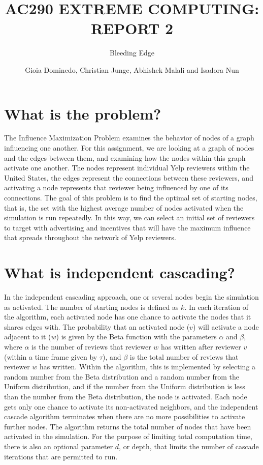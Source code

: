 \documentclass[11pt]{scrartcl} %
\title{AC290 EXTREME COMPUTING: REPORT 2}
\subtitle{Bleeding Edge}
\author{Gioia Dominedo, Christian Junge, Abhishek Malali and Isadora Nun}
\begin{document}
\maketitle

\section{What is the problem?}

\setlength{\parindent}{10ex}

The Influence Maximization Problem examines the behavior of nodes of a graph influencing one another.  For this assignment, we are looking at a graph of nodes and the edges between them, and examining how the nodes within this graph activate one another.  The nodes represent individual Yelp reviewers within the United States, the edges represent the connections between these reviewers, and activating a node represents that reviewer being influenced by one of its connections.  The goal of this problem is to find the optimal set of starting nodes, that is, the set with the highest average number of nodes activated when the simulation is run repeatedly.  In this way, we can select an initial set of reviewers to target with advertising and incentives that will have the maximum influence that spreads throughout the network of Yelp reviewers.  


\section{What is independent cascading?}

In the independent cascading approach, one or several nodes begin the simulation as activated.  The number of starting nodes is defined as $k$. In each iteration of the algorithm, each activated node has one chance to activate the nodes that it shares edges with.  The probability that an activated node ($v$) will activate a node adjacent to it ($w$) is given by the Beta function with the parameters $\alpha$ and $\beta$, where $\alpha$ is the number of reviews that reviewer $w$ has written after reviewer $v$ (within a time frame given by $\tau$), and $\beta$ is the total number of reviews that reviewer $w$ has written.  Within the algorithm, this is implemented by selecting a random number from the Beta distribution and a random number from the Uniform distribution, and if the number from the Uniform distribution is less than the number from the Beta distribution, the node is activated.  Each node gets only one chance to activate its non-activated neighbors, and the independent cascade algorithm terminates when there are no more possibilities to activate further nodes.  The algorithm returns the total number of nodes that have been activated in the simulation.  For the purpose of limiting total computation time, there is also an optional parameter $d$, or depth, that limits the number of cascade iterations that are permitted to run.  
\end{document}
